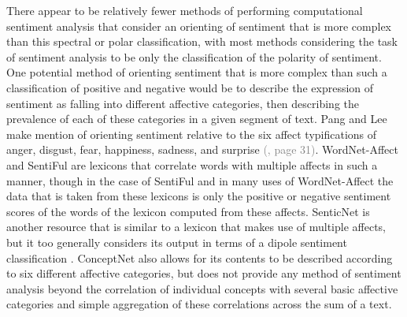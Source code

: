 \documentclass[letterpaper, 10 pt, conference]{ieeeconf}
\begin{document}
There appear to be relatively fewer methods of performing computational sentiment analysis that consider an orienting of sentiment that is more complex than this spectral or polar classification, with most methods considering the task of sentiment analysis to be only the classification of the polarity of sentiment. One potential method of orienting sentiment that is more complex than such a classification of positive and negative would be to describe the expression of sentiment as falling into different affective categories, then describing the prevalence of each of these categories in a given segment of text. Pang and Lee make mention of orienting sentiment relative to the six affect typifications of anger, disgust, fear, happiness, sadness, and surprise \textcolor{gray}{(\cite{PangLee}, page 31)}. WordNet-Affect \textcolor{gray}{\cite{Strapparava}} and SentiFul \textcolor{gray}{\cite{Neviarouskaya}} are lexicons that correlate words with multiple affects in such a manner, though in the case of SentiFul and in many uses of WordNet-Affect the data that is taken from these lexicons is only the positive or negative sentiment scores of the words of the lexicon computed from these affects. SenticNet is another resource that is similar to a lexicon that makes use of multiple affects, but it too generally considers its output in terms of a dipole sentiment classification \textcolor{gray}{\cite{CambriaSpeer}}. ConceptNet also allows for its contents to be described according to six different affective categories, but does not provide any method of sentiment analysis beyond the correlation of individual concepts with several basic affective categories and simple aggregation of these correlations across the sum of a text\textcolor{gray}{\cite{Liu}}.
\end{document}
